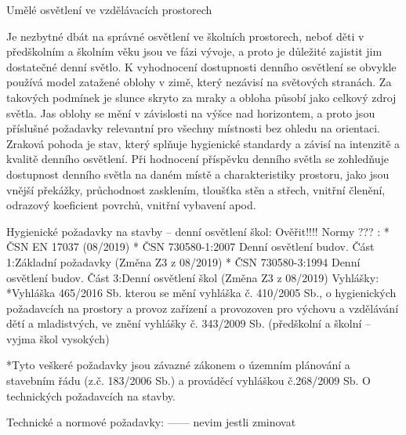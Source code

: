 \sec Umělé osvětlení ve vzdělávacích prostorech

Je nezbytné dbát na správné osvětlení ve školních prostorech, neboť děti v předškolním a školním věku jsou ve fázi vývoje, a proto je důležité zajistit jim dostatečné denní světlo. K vyhodnocení dostupnosti denního osvětlení se obvykle používá model zatažené oblohy v zimě, který nezávisí na světových stranách. Za takových podmínek je slunce skryto za mraky a obloha působí jako celkový zdroj světla. Jas oblohy se mění v závislosti na výšce nad horizontem, a proto jsou příslušné požadavky relevantní pro všechny místnosti bez ohledu na orientaci.
\medskip
Zraková pohoda je stav, který splňuje hygienické standardy a závisí na intenzitě a kvalitě denního osvětlení. Při hodnocení příspěvku denního světla se zohledňuje dostupnost denního světla na daném místě a charakteristiky prostoru, jako jsou vnější překážky, průchodnost zasklením, tloušťka stěn a střech, vnitřní členění, odrazový koeficient povrchů, vnitřní vybavení apod.

\secc Hygienické požadavky na stavby – denní osvětlení škol:
Ověřit!!!! Normy ??? :
\begitems
* ČSN EN 17037 (08/2019)
* ČSN 730580-1:2007 Denní osvětlení budov. Část 1:Základní požadavky (Změna Z3 z 08/2019)
* ČSN 730580-3:1994 Denní osvětlení budov. Část 3:Denní osvětlení škol (Změna Z3 z 08/2019)
\medskip
{\sbf Vyhlášky:}
\medskip
*Vyhláška 465/2016 Sb. kterou se mění vyhláška č. 410/2005 Sb., o hygienických požadavcích na prostory a provoz zařízení a provozoven pro výchovu a vzdělávání dětí a mladistvých, ve znění vyhlášky č. 343/2009 Sb.
(předškolní a školní – vyjma škol vysokých)

*Tyto veškeré požadavky jsou závazné zákonem o územním plánování a stavebním řádu (z.č. 183/2006 Sb.) a prováděcí vyhláškou č.268/2009 Sb. O technických požadavcích na stavby.
\enditems

\secc Technické a normové požadavky:   ------ nevim jestli zminovat

